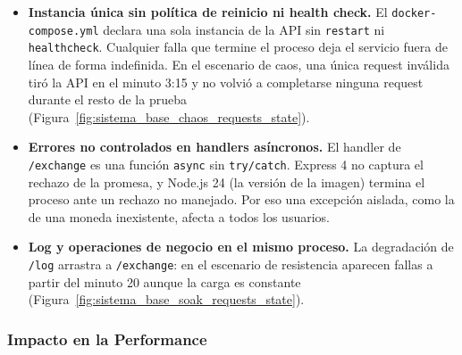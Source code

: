         \begin{itemize}
            \item \textbf{Instancia única sin política de reinicio ni health check.} El
            \texttt{docker-compose.yml} declara una sola instancia de la API sin
            \texttt{restart} ni \texttt{healthcheck}. Cualquier falla que termine el
            proceso deja el servicio fuera de línea de forma indefinida. En el escenario
            de caos, una única request inválida tiró la API en el minuto 3:15 y no volvió
            a completarse ninguna request durante el resto de la prueba
            (Figura~\ref{fig:sistema_base_chaos_requests_state}).
            \item \textbf{Errores no controlados en handlers asíncronos.} El handler de
            \texttt{/exchange} es una función \texttt{async} sin \texttt{try/catch}.
            Express 4 no captura el rechazo de la promesa, y Node.js 24 (la versión de la
            imagen) termina el proceso ante un rechazo no manejado. Por eso una excepción
            aislada, como la de una moneda inexistente, afecta a todos los usuarios.
            \item \textbf{Log y operaciones de negocio en el mismo proceso.} La
            degradación de \texttt{/log} arrastra a \texttt{/exchange}: en el escenario de
            resistencia aparecen fallas a partir del minuto 20 aunque la carga es constante
            (Figura~\ref{fig:sistema_base_soak_requests_state}).
        \end{itemize}

        \subsubsection{Impacto en la Performance}
        \label{sec:impacto_en_la_performance}

